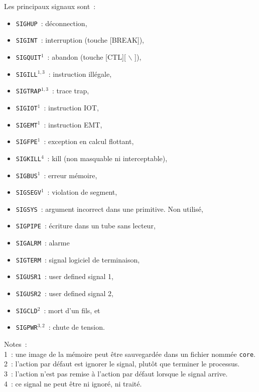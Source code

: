 \documentclass [twoside] {report}
\begin{document}
Les principaux signaux sont~:

\begin {itemize}
    \label {ps:sigv7}
    \item \texttt {SIGHUP}~: déconnection,
    \item \texttt {SIGINT}~: interruption (touche [BREAK]),
    \item \texttt {SIGQUIT}{$^1$}~: abandon (touche [CTL]{[ $\backslash$ ]}),
    \item \texttt {SIGILL}{$^{1, 3}$}~: instruction illégale,
    \item \texttt {SIGTRAP}{$^{1, 3}$}~: trace trap,
    \item \texttt {SIGIOT}{$^1$}~: instruction IOT,
    \item \texttt {SIGEMT}{$^1$}~: instruction EMT,
    \item \texttt {SIGFPE}{$^1$}~: exception en calcul flottant,
    \item \texttt {SIGKILL}{$^4$}~: kill (non masquable ni interceptable),
    \item \texttt {SIGBUS}{$^1$}~: erreur mémoire,
    \item \texttt {SIGSEGV}{$^1$}~: violation de segment,
    \item \texttt {SIGSYS}~: argument incorrect dans une primitive. Non utilisé,
    \item \texttt {SIGPIPE}~: écriture dans un tube sans lecteur,
    \item \texttt {SIGALRM}~: alarme
    \item \texttt {SIGTERM}~: signal logiciel de terminaison,
    \item \texttt {SIGUSR1}~: user defined signal 1,
    \item \texttt {SIGUSR2}~: user defined signal 2,
    \item \texttt {SIGCLD}{$^2$}~: mort d'un fils, et
    \item \texttt {SIGPWR}{$^{3, 2}$}~: chute de tension.
\end {itemize}

Notes~: \\
1~: une image de la mémoire peut être sauvegardée dans
un fichier nommée \texttt {core}. \\
2~: l'action par défaut est ignorer le
signal, plutôt que terminer le processus. \\
3~: l'action n'est pas remise à l'action par
défaut lorsque le signal arrive. \\
4~: ce signal ne peut être ni ignoré, ni traité.
\end{document}
